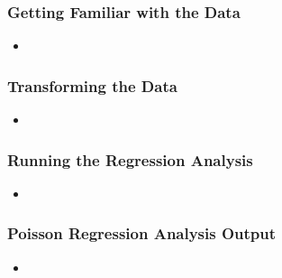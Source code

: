 \documentclass{beamer}
\begin{document}
\begin{frame}[fragile]\frametitle{Getting Familiar with the Data}

	
	\begin{itemize}
	
		\item 

	\end{itemize}

\end{frame}



\begin{frame}[fragile]\frametitle{Transforming the Data}

	
	\begin{itemize}
	
		\item 

	\end{itemize}

\end{frame}



\begin{frame}[fragile]\frametitle{Running the Regression Analysis}

	
	\begin{itemize}
	
		\item 

	\end{itemize}

\end{frame}



\begin{frame}[fragile]\frametitle{Poisson Regression Analysis Output}

	
	\begin{itemize}
	
		\item 

	\end{itemize}

\end{frame}
\end{document}
